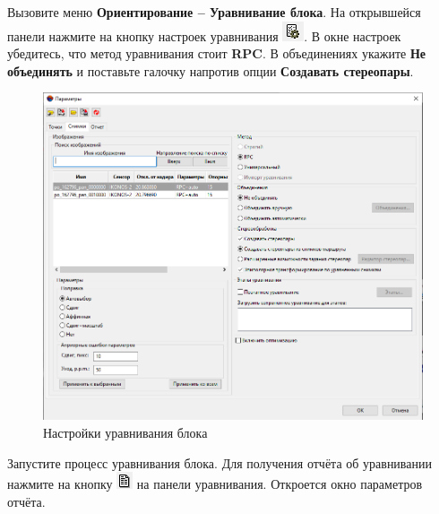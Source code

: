 \documentclass[
  12pt,
]{book}
\begin{document}
Вызовите меню \textbf{Ориентирование -- Уравнивание блока}. На открывшейся панели нажмите на кнопку настроек уравнивания \includegraphics{images/Ref17/Adjustment.png}. В окне настроек убедитесь, что метод уравнивания стоит \textbf{RPC}. В объединениях укажите \textbf{Не объединять} и поставьте галочку напротив опции \textbf{Создавать стереопары}.

\begin{figure}
\centering
\includegraphics{images/Ref17/Adjustment_Settings.png}
\caption{Настройки уравнивания блока}
\end{figure}

Запустите процесс уравнивания блока. Для получения отчёта об уравнивании нажмите на кнопку \includegraphics{images/Ref17/Adjustment_Report.png} на панели уравнивания. Откроется окно параметров отчёта.
\end{document}
